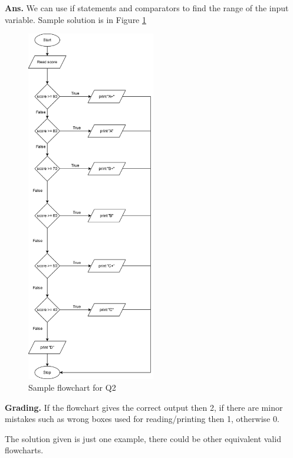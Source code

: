 \documentclass{article}
\begin{document}
\begin{flushleft}

\textbf{Ans. } We can use if statements and comparators to find the range of the 
input variable. Sample solution is in Figure \ref{Q2}

\begin{figure}[ht]
    \centering
    \includegraphics[width=0.5\textwidth]{Q2.png}
    \caption{Sample flowchart for Q2}
    \label{Q2}
\end{figure}

\end{flushleft}

\begin{flushleft}
\textbf{Grading. } If the flowchart gives the correct output then 2, if there are 
minor mistakes such as wrong boxes used for reading/printing then 1, otherwise 0.

The solution given is just one example, there could be other equivalent valid 
flowcharts.
\end{flushleft}
\end{document}
